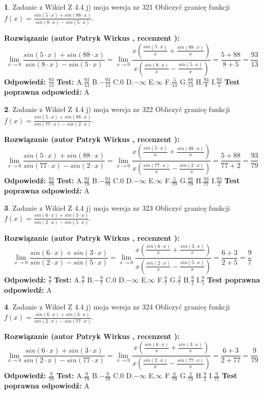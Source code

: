 \documentclass[12pt, a4paper]{article}
\theoremstyle{definition} %
\newtheorem{zad}{}
\newcommand{\zadStart}[1]{\begin{zad}#1\newline}
\newcommand{\zadStop}{\end{zad}}
\newcommand{\rozwStart}[2]{\noindent \textbf{Rozwiązanie (autor #1 , recenzent #2): }\newline}
\newcommand{\rozwStop}{\newline}
\newcommand{\odpStart}{\noindent \textbf{Odpowiedź:}\newline}
\newcommand{\odpStop}{\newline}
\newcommand{\testStart}{\noindent \textbf{Test:}\newline}
\newcommand{\testStop}{\newline}
\newcommand{\kluczStart}{\noindent \textbf{Test poprawna odpowiedź:}\newline}
\newcommand{\kluczStop}{\newline}
\begin{document}
\zadStart{Zadanie z Wikieł Z 4.4 j) moja wersja nr 321}
Obliczyć granicę funkcji $f(x)=\frac{sin(5\cdot x) +sin(88\cdot x)}{sin(8\cdot x) -sin(5\cdot x)}$.
\zadStop
\rozwStart{Patryk Wirkus}{}
$$\lim\limits_{x\to 0}\frac{sin(5\cdot x) +sin(88\cdot x)}{sin(8\cdot x) -sin(5\cdot x)}=\lim\limits_{x\to 0}\frac{x(\frac{sin(5\cdot x)}{x}+\frac{sin(88\cdot x)}{x})}{x(\frac{sin(8\cdot x)}{x}-\frac{sin(5\cdot x)}{x})}=\frac{5+88}{8+5} = \frac{93}{13}$$
\rozwStop
\odpStart
$\frac{93}{13}$
\odpStop
\testStart
A.$\frac{93}{13}$
B.$-\frac{93}{13}$
C.$0$
D.$-\infty$
E.$\infty$
F.$\frac{5}{13}$
G.$\frac{88}{13}$
H.$\frac{93}{8}$
I.$\frac{93}{5}$
\testStop
\kluczStart
A
\kluczStop



\zadStart{Zadanie z Wikieł Z 4.4 j) moja wersja nr 322}
Obliczyć granicę funkcji $f(x)=\frac{sin(5\cdot x) +sin(88\cdot x)}{sin(77\cdot x) -sin(2\cdot x)}$.
\zadStop
\rozwStart{Patryk Wirkus}{}
$$\lim\limits_{x\to 0}\frac{sin(5\cdot x) +sin(88\cdot x)}{sin(77\cdot x) -sin(2\cdot x)}=\lim\limits_{x\to 0}\frac{x(\frac{sin(5\cdot x)}{x}+\frac{sin(88\cdot x)}{x})}{x(\frac{sin(77\cdot x)}{x}-\frac{sin(2\cdot x)}{x})}=\frac{5+88}{77+2} = \frac{93}{79}$$
\rozwStop
\odpStart
$\frac{93}{79}$
\odpStop
\testStart
A.$\frac{93}{79}$
B.$-\frac{93}{79}$
C.$0$
D.$-\infty$
E.$\infty$
F.$\frac{5}{79}$
G.$\frac{88}{79}$
H.$\frac{93}{77}$
I.$\frac{93}{2}$
\testStop
\kluczStart
A
\kluczStop



\zadStart{Zadanie z Wikieł Z 4.4 j) moja wersja nr 323}
Obliczyć granicę funkcji $f(x)=\frac{sin(6\cdot x) +sin(3\cdot x)}{sin(2\cdot x) -sin(5\cdot x)}$.
\zadStop
\rozwStart{Patryk Wirkus}{}
$$\lim\limits_{x\to 0}\frac{sin(6\cdot x) +sin(3\cdot x)}{sin(2\cdot x) -sin(5\cdot x)}=\lim\limits_{x\to 0}\frac{x(\frac{sin(6\cdot x)}{x}+\frac{sin(3\cdot x)}{x})}{x(\frac{sin(2\cdot x)}{x}-\frac{sin(5\cdot x)}{x})}=\frac{6+3}{2+5} = \frac{9}{7}$$
\rozwStop
\odpStart
$\frac{9}{7}$
\odpStop
\testStart
A.$\frac{9}{7}$
B.$-\frac{9}{7}$
C.$0$
D.$-\infty$
E.$\infty$
F.$\frac{6}{7}$
G.$\frac{3}{7}$
H.$\frac{9}{2}$
I.$\frac{9}{5}$
\testStop
\kluczStart
A
\kluczStop



\zadStart{Zadanie z Wikieł Z 4.4 j) moja wersja nr 324}
Obliczyć granicę funkcji $f(x)=\frac{sin(6\cdot x) +sin(3\cdot x)}{sin(2\cdot x) -sin(77\cdot x)}$.
\zadStop
\rozwStart{Patryk Wirkus}{}
$$\lim\limits_{x\to 0}\frac{sin(6\cdot x) +sin(3\cdot x)}{sin(2\cdot x) -sin(77\cdot x)}=\lim\limits_{x\to 0}\frac{x(\frac{sin(6\cdot x)}{x}+\frac{sin(3\cdot x)}{x})}{x(\frac{sin(2\cdot x)}{x}-\frac{sin(77\cdot x)}{x})}=\frac{6+3}{2+77} = \frac{9}{79}$$
\rozwStop
\odpStart
$\frac{9}{79}$
\odpStop
\testStart
A.$\frac{9}{79}$
B.$-\frac{9}{79}$
C.$0$
D.$-\infty$
E.$\infty$
F.$\frac{6}{79}$
G.$\frac{3}{79}$
H.$\frac{9}{2}$
I.$\frac{9}{77}$
\testStop
\kluczStart
A
\kluczStop
\end{document}
